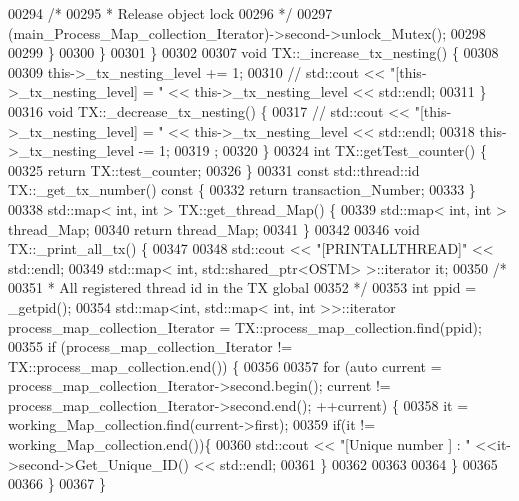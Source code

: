 \begin{DoxyCode}
00294                 \textcolor{comment}{/*}
00295 \textcolor{comment}{                 * Release object lock}
00296 \textcolor{comment}{                 */}
00297                 (main\_Process\_Map\_collection\_Iterator)->second->unlock\_Mutex();
00298                 
00299             \} 
00300         \}
00301 \}
00302 
00307 \textcolor{keywordtype}{void} TX::\_increase\_tx\_nesting() \{
00308       
00309     this->\_tx\_nesting\_level += 1;
00310     \textcolor{comment}{// std::cout << "[this->\_tx\_nesting\_level] = " << this->\_tx\_nesting\_level << std::endl;}
00311 \}
00316 \textcolor{keywordtype}{void} TX::\_decrease\_tx\_nesting() \{
00317    \textcolor{comment}{// std::cout << "[this->\_tx\_nesting\_level] = " << this->\_tx\_nesting\_level << std::endl;}
00318     this->\_tx\_nesting\_level -= 1;
00319 ;
00320 \}
00324 \textcolor{keywordtype}{int} TX::getTest\_counter() \{
00325     \textcolor{keywordflow}{return} TX::test\_counter;
00326 \}
00331 \textcolor{keyword}{const} std::thread::id TX::\_get\_tx\_number()\textcolor{keyword}{ const }\{
00332     \textcolor{keywordflow}{return} transaction\_Number;
00333 \}
00338 std::map< int, int > TX::get\_thread\_Map() \{
00339     std::map< int, int > thread\_Map;
00340     \textcolor{keywordflow}{return} thread\_Map;
00341 \}
00342 
00346 \textcolor{keywordtype}{void} TX::\_print\_all\_tx() \{
00347 
00348     std::cout << \textcolor{stringliteral}{"[PRINTALLTHREAD]"} << std::endl;
00349     std::map< int, std::shared\_ptr<OSTM> >::iterator it;
00350     \textcolor{comment}{/*}
00351 \textcolor{comment}{     * All registered thread id in the TX global }
00352 \textcolor{comment}{     */}
00353      \textcolor{keywordtype}{int} ppid = \_getpid();
00354     std::map<int, std::map< int, int >>::iterator process\_map\_collection\_Iterator = 
      TX::process\_map\_collection.find(ppid);
00355     \textcolor{keywordflow}{if} (process\_map\_collection\_Iterator != TX::process\_map\_collection.end()) \{
00356 
00357         \textcolor{keywordflow}{for} (\textcolor{keyword}{auto} current = process\_map\_collection\_Iterator->second.begin(); current != 
      process\_map\_collection\_Iterator->second.end(); ++current) \{
00358             it = working\_Map\_collection.find(current->first);
00359             \textcolor{keywordflow}{if}(it != working\_Map\_collection.end())\{
00360                 std::cout << \textcolor{stringliteral}{"[Unique number ] : "} <<it->second->Get\_Unique\_ID() << std::endl;
00361             \}
00362 
00363             
00364         \}
00365      
00366     \}
00367 \}
\end{DoxyCode}
